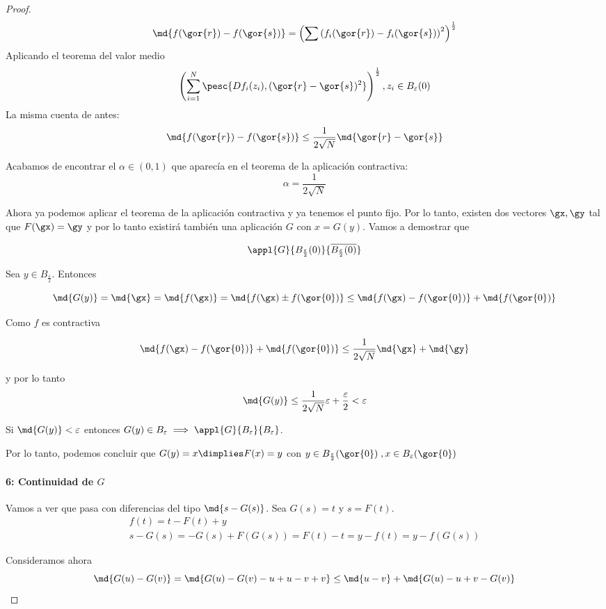 \begin{proof}
  $$\md{f(\gor{r}) - f(\gor{s})} = \left(\sum \left( f_i(\gor{r}) - f_i(\gor{s})\right) ^2 \right)^{\frac{1}{2}}$$
  Aplicando el teorema del valor medio
  $$\left(\sum_{i=1}^N \pesc{Df_i(z_i), (\gor{r}-\gor{s})^2}\right)^{\frac{1}{2}}, z_i\in B_\varepsilon(0) $$
  La misma cuenta de antes:
  $$\md{f(\gor{r}) - f(\gor{s})} \leq \frac{1}{2\sqrt{N}}\md{\gor{r}-\gor{s}}$$
  
  Acabamos de encontrar el $\alpha \in (0, 1)$ que aparecía en el teorema de la aplicación contractiva: \[ \alpha = \frac{1}{2\sqrt{N}} \]
  
  Ahora ya podemos aplicar el teorema de la aplicación contractiva y ya tenemos el punto fijo. Por lo tanto, existen dos vectores $\gx, \gy$ tal que $F(\gx) = \gy$ y por lo tanto existirá también una aplicación $G$ con $x= G(y)$. Vamos a demostrar que
  
  \[ \appl{G}{B_{\frac{\varepsilon}{2}}(0)}{\overline{{B_{\frac{\varepsilon}{2}}(0)}}} \]
  
  Sea $y \in B_{\frac{\varepsilon}{2}}$. Entonces

\[ \md{G(y)} = \md{\gx} = \md{f(\gx)} = \md{f(\gx) \pm f(\gor{0})} \leq \md{f(\gx) - f(\gor{0})} + \md{f(\gor{0})} \] 

Como $f$ es contractiva

\[ \md{f(\gx) - f(\gor{0})} + \md{f(\gor{0})} \leq \frac{1}{2\sqrt{N}} \md{\gx} + \md{\gy} \]

y por lo tanto 
\[ \md{G(y)} \leq \frac{1}{2\sqrt{N}}\varepsilon + \frac{\varepsilon}{2} < \varepsilon \]
  
  Si $\md{G(y)} < \varepsilon$ entonces  $G(y)\in B_{\varepsilon} \implies \appl{G}{B_\varepsilon}{B_\varepsilon}$.
  
  Por lo tanto, podemos concluir que $G(y) = x \dimplies F(x) = y$ con $y\in B_{\frac{\varepsilon}{2}}(\gor{0})\;, x \in B_{\varepsilon}(\gor{0})$
  
  \paragraph{6: Continuidad de $G$}
  
  
  Vamos a ver que pasa con diferencias del tipo $\md{s -G(s)}$. Sea $G(s) = t$ y $s = F(t)$.
  \begin{gather*}
  f(t) = t - F(t) + y\\
  s - G(s) = -G(s) + F(G(s)) = F(t)-t = y-f(t) = y - f(G(s))
  \end{gather*}
 
Consideramos ahora \[ \md{G(u)-G(v)} = \md{G(u)-G(v) -u +u-v+v} \leq \md{u-v} + \md{G(u)-u + v-G(v)} \]


\end{proof}
